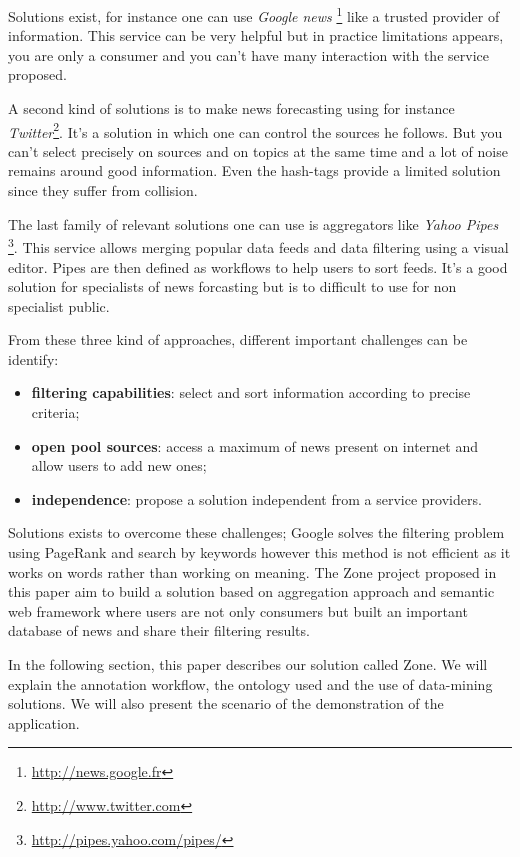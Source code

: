\documentclass{llncs}
\begin{document}
Solutions exist, for instance one can use \textsl{Google news} \footnote{\url{http://news.google.fr}} like a trusted provider of information. This service can be very helpful but in practice limitations appears, you are only a consumer and you can't have many interaction with the service proposed.

A second kind of solutions is to make news forecasting using for instance \textsl{Twitter}\footnote{\url{http://www.twitter.com}}. It's a solution in which one can control the sources he follows. But you can't select precisely on sources and on topics at the same time and a lot of noise remains around good information. Even the hash-tags provide a limited solution since they suffer from collision.  

The last family of relevant solutions one can use is aggregators like \textsl{Yahoo Pipes} \footnote{\url{http://pipes.yahoo.com/pipes/}}. This service allows merging popular data feeds and data filtering using a visual editor. Pipes are then defined as workflows to help users to sort feeds. It's a good solution for specialists of news forcasting but is to difficult to use for non specialist public.

From these three kind of approaches, different important challenges can be identify:
\begin{itemize}
  \item \textbf{filtering capabilities}: select and sort information according to precise criteria;
  \item \textbf{open pool sources}: access a maximum of news present on internet and allow users to add new ones;
  \item \textbf{independence}: propose a solution independent from a service providers.
\end{itemize}

Solutions exists to overcome these challenges; Google solves the filtering problem using PageRank and search by keywords \cite{page:brin} however this method is not efficient as it works on words rather than working on meaning. The Zone project proposed in this paper aim to build a solution based on aggregation approach and semantic web framework where users are not only consumers but built an important database of news and share their filtering results.

In the following section, this paper describes our solution called Zone. We will explain the annotation workflow, the ontology used and the use of data-mining solutions. We will also present the scenario of the demonstration of the application.
\end{document}
